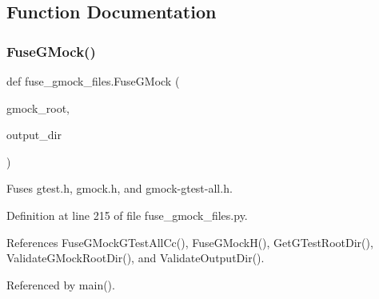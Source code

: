 \subsection{Function Documentation}
\mbox{\label{namespacefuse__gmock__files_ae76b6bc18373325fc3f002abf5c4378f}} 
\subsubsection{\texorpdfstring{Fuse\+G\+Mock()}{FuseGMock()}}
{\footnotesize\ttfamily def fuse\+\_\+gmock\+\_\+files.\+Fuse\+G\+Mock (\begin{DoxyParamCaption}\item[{}]{gmock\+\_\+root,  }\item[{}]{output\+\_\+dir }\end{DoxyParamCaption})}

\begin{DoxyVerb}Fuses gtest.h, gmock.h, and gmock-gtest-all.h.\end{DoxyVerb}
 

Definition at line 215 of file fuse\+\_\+gmock\+\_\+files.\+py.



References Fuse\+G\+Mock\+G\+Test\+All\+Cc(), Fuse\+G\+Mock\+H(), Get\+G\+Test\+Root\+Dir(), Validate\+G\+Mock\+Root\+Dir(), and Validate\+Output\+Dir().



Referenced by main().


